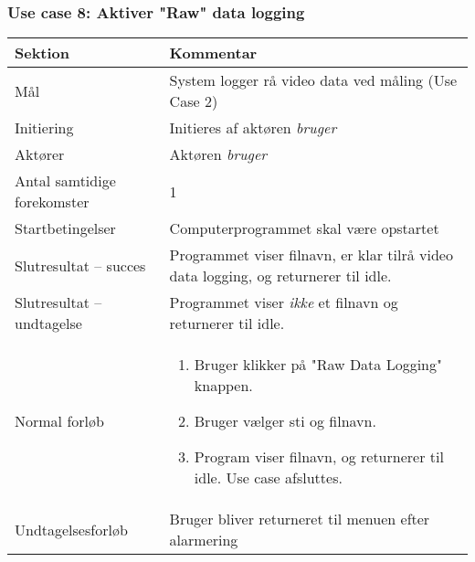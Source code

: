 \documentclass[kravspec.tex]{subfiles}
\begin{document}
	\subsubsection{Use case 8: Aktiver "Raw" data logging}
	\begin{tabular}{|l|p{7.7cm}|}
		\hline \textbf{Sektion} 	& \textbf{Kommentar} \\ 
		\hline Mål  & System logger rå video data ved måling (Use Case 2) \\ 
		\hline Initiering  & Initieres af aktøren \textit{bruger} \\ 
		\hline Aktører & Aktøren \textit{bruger} \\ 
		\hline Antal samtidige forekomster & 1 \\ 
		\hline Startbetingelser & Computerprogrammet skal være opstartet \\ 
		\hline Slutresultat – succes & Programmet viser filnavn, er klar tilrå video data logging, og returnerer til idle. \\ 
		\hline Slutresultat – undtagelse & Programmet viser \textit{ikke} et filnavn og returnerer til idle. \\ 
		\hline Normal forløb & \begin{enumerate}
			\item Bruger klikker på "Raw Data Logging" knappen.
			\item Bruger vælger sti og filnavn.
			\item Program viser filnavn, og returnerer til idle. Use case afsluttes.
		\end{enumerate} \\ 
		\hline Undtagelsesforløb & Bruger bliver returneret til menuen efter alarmering \\ 
		\hline 
	\end{tabular}
	
\end{document}
